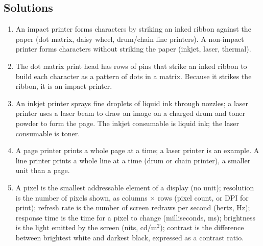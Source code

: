\documentclass[11pt]{article}
\begin{document}
\subsection*{Solutions}
\begingroup\small
\begin{enumerate}[label=\arabic*.]
  \item An impact printer forms characters by striking an inked ribbon
    against the paper (dot matrix, daisy wheel, drum/chain line printers). A
    non-impact printer forms characters without striking the paper (inkjet,
    laser, thermal).
  \item The dot matrix print head has rows of pins that strike an inked
    ribbon to build each character as a pattern of dots in a matrix. Because
    it strikes the ribbon, it is an impact printer.
  \item An inkjet printer sprays fine droplets of liquid ink through nozzles;
    a laser printer uses a laser beam to draw an image on a charged drum and
    toner powder to form the page. The inkjet consumable is liquid ink; the
    laser consumable is toner.
  \item A page printer prints a whole page at a time; a laser printer is an
    example. A line printer prints a whole line at a time (drum or chain
    printer), a smaller unit than a page.
  \item A pixel is the smallest addressable element of a display (no unit);
    resolution is the number of pixels shown, as columns $\times$ rows (pixel
    count, or DPI for print); refresh rate is the number of screen redraws per
    second (hertz, Hz); response time is the time for a pixel to change
    (milliseconds, ms); brightness is the light emitted by the screen (nits,
    cd/m$^2$); contrast is the difference between brightest white and darkest
    black, expressed as a contrast ratio.
\end{enumerate}
\endgroup
\end{document}
